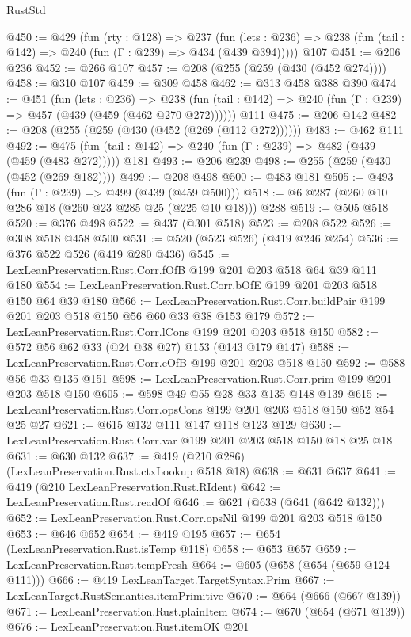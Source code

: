 \begin{lexlean}{RustStd}
\begin{coremodule}
@450 := @429
    (fun (rty : @128) =>
    @237
      (fun (lets : @236) => @238 (fun (tail : @142) => @240 (fun (Γ : @239) => @434 (@439 @394)))))
    @107
@451 := @206 @236
@452 := @266 @107
@457 := @208 (@255 (@259 (@430 (@452 @274))))
@458 := @310 @107
@459 := @309 @458
@462 := @313 @458 @388 @390
@474 := @451
    (fun (lets : @236) =>
    @238 (fun (tail : @142) => @240 (fun (Γ : @239) => @457 (@439 (@459 (@462 @270 @272))))))
    @111
@475 := @206 @142
@482 := @208 (@255 (@259 (@430 (@452 (@269 (@112 @272))))))
@483 := @462 @111
@492 := @475 (fun (tail : @142) => @240 (fun (Γ : @239) => @482 (@439 (@459 (@483 @272))))) @181
@493 := @206 @239
@498 := @255 (@259 (@430 (@452 (@269 @182))))
@499 := @208 @498
@500 := @483 @181
@505 := @493 (fun (Γ : @239) => @499 (@439 (@459 @500)))
@518 := @6 @287 (@260 @10 @286 @18 (@260 @23 @285 @25 (@225 @10 @18))) @288
@519 := @505 @518
@520 := @376 @498
@522 := @437 (@301 @518)
@523 := @208 @522
@526 := @308 @518 @458 @500
@531 := @520 (@523 @526) (@419 @246 @254)
@536 := @376 @522 @526 (@419 @280 @436)
@545 := LexLeanPreservation.Rust.Corr.fOfB @199 @201 @203 @518 @64 @39 @111 @180
@554 := LexLeanPreservation.Rust.Corr.bOfE @199 @201 @203 @518 @150 @64 @39 @180
@566 := LexLeanPreservation.Rust.Corr.buildPair @199 @201 @203 @518 @150 @56 @60 @33 @38 @153 @179
@572 := LexLeanPreservation.Rust.Corr.lCons @199 @201 @203 @518 @150
@582 := @572 @56 @62 @33 (@24 @38 @27) @153 (@143 @179 @147)
@588 := LexLeanPreservation.Rust.Corr.eOfB @199 @201 @203 @518 @150
@592 := @588 @56 @33 @135 @151
@598 := LexLeanPreservation.Rust.Corr.prim @199 @201 @203 @518 @150
@605 := @598 @49 @55 @28 @33 @135 @148 @139
@615 := LexLeanPreservation.Rust.Corr.opsCons @199 @201 @203 @518 @150 @52 @54 @25 @27
@621 := @615 @132 @111 @147 @118 @123 @129
@630 := LexLeanPreservation.Rust.Corr.var @199 @201 @203 @518 @150 @18 @25 @18
@631 := @630 @132
@637 := @419 (@210 @286) (LexLeanPreservation.Rust.ctxLookup @518 @18)
@638 := @631 @637
@641 := @419 (@210 LexLeanPreservation.Rust.RIdent)
@642 := LexLeanPreservation.Rust.readOf
@646 := @621 (@638 (@641 (@642 @132)))
@652 := LexLeanPreservation.Rust.Corr.opsNil @199 @201 @203 @518 @150
@653 := @646 @652
@654 := @419 @195
@657 := @654 (LexLeanPreservation.Rust.isTemp @118)
@658 := @653 @657
@659 := LexLeanPreservation.Rust.tempFresh
@664 := @605 (@658 (@654 (@659 @124 @111)))
@666 := @419 LexLeanTarget.TargetSyntax.Prim
@667 := LexLeanTarget.RustSemantics.itemPrimitive
@670 := @664 (@666 (@667 @139))
@671 := LexLeanPreservation.Rust.plainItem
@674 := @670 (@654 (@671 @139))
@676 := LexLeanPreservation.Rust.itemOK @201

\end{coremodule}
\end{lexlean}
